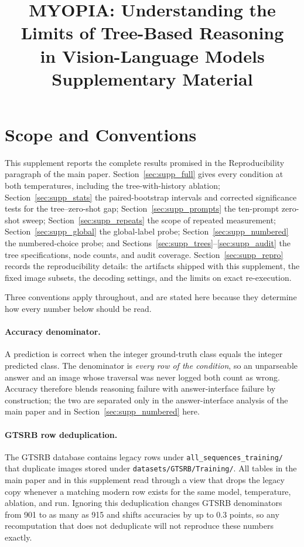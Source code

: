 \documentclass[10pt,twocolumn,letterpaper]{article}
\title{\vspace{-2em}MYOPIA: Understanding the Limits of Tree-Based Reasoning\\
in Vision-Language Models\\[0.4em]\large Supplementary Material}
\author{}
\date{}
\begin{document}
\maketitle
\vspace{-3em}



\section{Scope and Conventions}
\label{sec:supp_scope}

This supplement reports the complete results promised in the Reproducibility
paragraph of the main paper. Section~\ref{sec:supp_full} gives every condition
at both temperatures, including the tree-with-history ablation;
Section~\ref{sec:supp_stats} the paired-bootstrap intervals and corrected
significance tests for the tree--zero-shot gap;
Section~\ref{sec:supp_prompts} the ten-prompt zero-shot sweep;
Section~\ref{sec:supp_repeats} the scope of repeated measurement;
Section~\ref{sec:supp_global} the global-label probe;
Section~\ref{sec:supp_numbered} the numbered-choice probe; and
Sections~\ref{sec:supp_trees}--\ref{sec:supp_audit} the tree specifications,
node counts, and audit coverage. Section~\ref{sec:supp_repro} records the
reproducibility details: the artifacts shipped with this supplement, the fixed
image subsets, the decoding settings, and the limits on exact
re-execution.

Three conventions apply throughout, and are stated here because they determine
how every number below should be read.

\paragraph{Accuracy denominator.} A prediction is correct when the integer
ground-truth class equals the integer predicted class. The denominator is
\emph{every row of the condition}, so an unparseable answer and an image whose
traversal was never logged both count as wrong. Accuracy therefore blends
reasoning failure with answer-interface failure by construction; the two are
separated only in the answer-interface analysis of the main paper and in
Section~\ref{sec:supp_numbered} here.

\paragraph{GTSRB row deduplication.} The GTSRB database contains legacy rows
under \texttt{all\_sequences\_training/} that duplicate images stored under
\texttt{datasets/GTSRB/Training/}. All tables in the main paper and in this
supplement read through a view that drops the legacy copy whenever a matching
modern row exists for the same model, temperature, ablation, and run. Ignoring
this deduplication changes GTSRB denominators from 901 to as many as 915 and
shifts accuracies by up to 0.3 points, so any recomputation that does not
deduplicate will not reproduce these numbers exactly.
\end{document}
